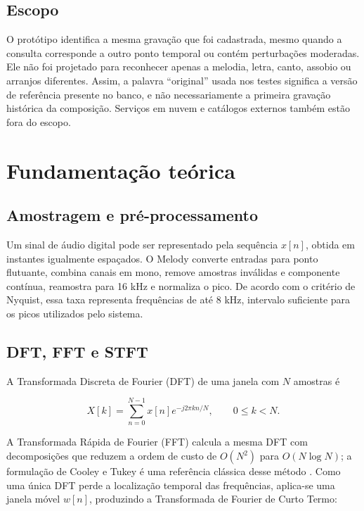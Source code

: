 \documentclass[12pt,a4paper]{article}
\begin{document}
\subsection{Escopo}

O protótipo identifica a mesma gravação que foi cadastrada, mesmo quando a
consulta corresponde a outro ponto temporal ou contém perturbações moderadas. Ele
não foi projetado para reconhecer apenas a melodia, letra, canto, assobio ou
arranjos diferentes. Assim, a palavra “original” usada nos testes significa a
versão de referência presente no banco, e não necessariamente a primeira gravação
histórica da composição. Serviços em nuvem e catálogos externos também estão fora
do escopo.

\section{Fundamentação teórica}

\subsection{Amostragem e pré-processamento}

Um sinal de áudio digital pode ser representado pela sequência $x[n]$, obtida em
instantes igualmente espaçados. O Melody converte entradas para ponto flutuante,
combina canais em mono, remove amostras inválidas e componente contínua, reamostra
para 16 kHz e normaliza o pico. De acordo com o critério de Nyquist, essa taxa
representa frequências de até 8 kHz, intervalo suficiente para os picos utilizados
pelo sistema.

\subsection{DFT, FFT e STFT}

A Transformada Discreta de Fourier (DFT) de uma janela com $N$ amostras é

\begin{equation}
    X[k] = \sum_{n=0}^{N-1} x[n]e^{-j2\pi kn/N}, \qquad 0 \leq k < N.
    \label{eq:dft}
\end{equation}

A Transformada Rápida de Fourier (FFT) calcula a mesma DFT com decomposições que
reduzem a ordem de custo de $O(N^2)$ para $O(N\log N)$; a formulação de Cooley e
Tukey é uma referência clássica desse método \cite{cooley1965}. Como uma única
DFT perde a localização temporal das frequências, aplica-se uma janela móvel
$w[n]$, produzindo a Transformada de Fourier de Curto Termo:
\end{document}
